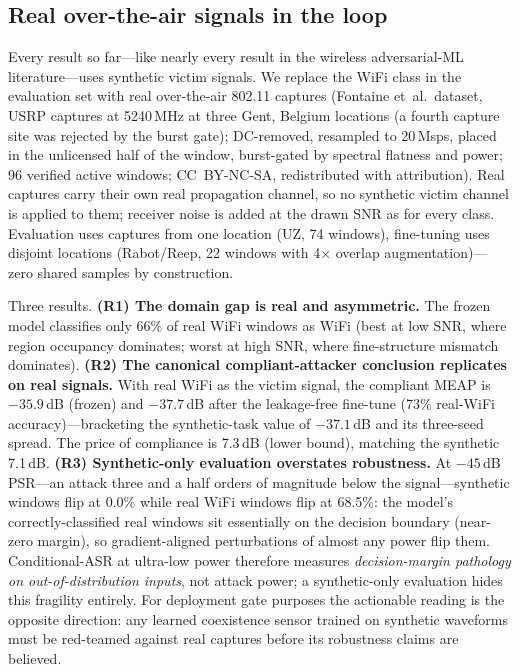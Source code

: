 \documentclass[review]{elsarticle}
\begin{document}
\subsection{Real over-the-air signals in the loop}
\label{sec:realwifi}

Every result so far---like nearly every result in the wireless
adversarial-ML literature---uses synthetic victim signals. We replace the
WiFi class in the evaluation set with real over-the-air 802.11 captures
(Fontaine et~al.\ dataset, USRP captures at 5240\,MHz at three Gent,
Belgium locations (a fourth capture site was rejected by the burst gate); DC-removed, resampled to 20\,Msps, placed in the
unlicensed half of the window, burst-gated by spectral flatness and power;
96 verified active windows; CC~BY-NC-SA, redistributed with
attribution). Real captures carry their own real propagation channel, so
no synthetic victim channel is applied to them; receiver noise is added at
the drawn SNR as for every class. Evaluation uses captures from one
location (UZ, 74 windows), fine-tuning uses disjoint locations
(Rabot/Reep, 22 windows with 4$\times$ overlap augmentation)---zero
shared samples by construction.

Three results. \textbf{(R1) The domain gap is real and asymmetric.} The
frozen model classifies only 66\% of real WiFi windows as WiFi (best at
low SNR, where region occupancy dominates; worst at high SNR, where
fine-structure mismatch dominates). \textbf{(R2) The canonical
compliant-attacker conclusion replicates on real signals.} With real WiFi
as the victim signal, the compliant MEAP is $-35.9$\,dB (frozen) and
$-37.7$\,dB after the leakage-free fine-tune (73\% real-WiFi
accuracy)---bracketing the synthetic-task value of $-37.1$\,dB and its
three-seed spread. The price of compliance is 7.3\,dB (lower bound),
matching the synthetic 7.1\,dB. \textbf{(R3) Synthetic-only evaluation
overstates robustness.} At $-45$\,dB PSR---an attack three and a half
orders of magnitude below the signal---synthetic windows flip at 0.0\%
while real WiFi windows flip at 68.5\%: the model's correctly-classified
real windows sit essentially on the decision boundary (near-zero margin),
so gradient-aligned perturbations of almost any power flip them.
Conditional-ASR at ultra-low power therefore measures \emph{decision-margin
pathology on out-of-distribution inputs}, not attack power; a
synthetic-only evaluation hides this fragility entirely. For deployment
gate purposes the actionable reading is the opposite direction: any
learned coexistence sensor trained on synthetic waveforms must be
red-teamed against real captures before its robustness claims are
believed.
\end{document}
